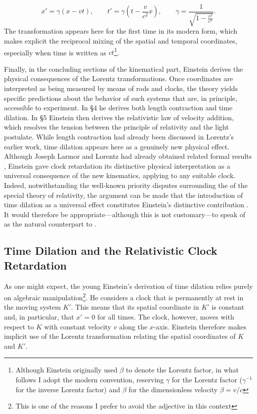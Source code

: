 \documentclass[pdflatex]{sn-jnl}
\newcommand{\igamma}{\ensuremath{\gamma^{-1}}\xspace}
\begin{document}
$$
x'=\gamma(x-vt),\qquad
t'=\gamma\!\left(t-\frac{v}{c^{2}}x\right),
\qquad
\gamma=\frac{1}{\sqrt{1-\frac{v^{2}}{c^{2}}}}.
$$
%
The transformation appears here for the first time in its modern form, which makes explicit the reciprocal mixing of the spatial and temporal coordinates, especially when time is written as $ct$\footnote{Although Einstein originally used $\beta$ to denote the Lorentz factor, in what follows I adopt the modern convention, reserving $\gamma$ for the Lorentz factor (\igamma for the inverse Lorentz factor) and $\beta$ for the dimensionless velocity $\beta=v/c$}.

Finally, in the concluding sections of the kinematical part, Einstein derives the physical consequences of the Lorentz transformations. Once coordinates are interpreted as being measured by means of rods and clocks, the theory yields specific predictions about the behavior of such systems that are, in principle, accessible to experiment. In \S4 he derives both length contraction and time dilation. In \S5 Einstein then derives the relativistic law of velocity addition, which resolves the tension between the principle of relativity and the light postulate. While length contraction had already been discussed in Lorentz’s earlier work, time dilation appears here as a genuinely new physical effect. Although Joseph Larmor and Lorentz had already obtained related formal results \citep[sec.~4.4 and~4.5]{Brown2005}, Einstein gave clock retardation its distinctive physical interpretation as a universal consequence of the new kinematics, applying to any suitable clock. Indeed, notwithstanding the well-known priority disputes surrounding the  of the special theory of relativity, the argument can be made that the introduction of time dilation as a universal effect constitutes Einstein’s distinctive contribution \citep{Rindler1970}. It would therefore be appropriate---although this is not customary---to speak of  as the natural counterpart to . 




\subsection{Time Dilation and the Relativistic Clock Retardation}
%
As one might expect, the young Einstein’s derivation of time dilation relies purely on algebraic manipulation\footnote{This is one of the reasons I prefer to avoid the adjective  in this context}. He considers a clock that is permanently at rest in the moving system $K'$. This means that its spatial coordinate in $K'$ is constant and, in particular, that $x' = 0$ for all times. The clock, however, moves with respect to $K$ with constant velocity $v$ along the $x$-axis. Einstein therefore makes implicit use of the Lorentz transformation relating the spatial coordinates of $K$ and $K'$.
\end{document}
